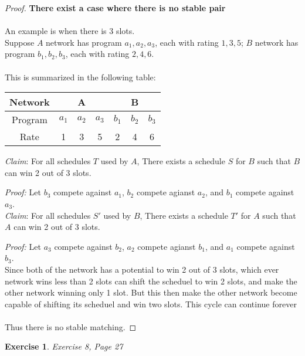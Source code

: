 \documentclass[11pt]{amsart}
\theoremstyle{theorem}
\newtheorem{exercise}{Exercise}
\begin{document}
\begin{proof}
\textbf{There exist a case where there is no stable pair} \\\\
An example is when there is 3 slots. \\
Suppose $ A $ network has program $ a_1, a_2, a_3 $, each with rating $ 1,3,5 $; $ B $ network has program $ b_1, b_2 ,b_3 $, each with rating $ 2,4,6 $.\\\\
This is summarized in the following table:\begin{table}
	\begin{tabular}{|c|c|l|l|c|l|l|}
		\hline
		\multicolumn{1}{|l|}{\textbf{Network}} & \multicolumn{3}{c|}{\textbf{A}}                                            & \multicolumn{3}{c|}{\textbf{B}}                                            \\ \hline
		Program                                & \multicolumn{1}{l|}{$a_1$} & $a_2$                    & $a_3$                    & \multicolumn{1}{l|}{$b_1$} & $b_2$                    & $b_3$                    \\ \hline
		Rate                                   & 1                        & \multicolumn{1}{c|}{3} & \multicolumn{1}{c|}{5} & 2                        & \multicolumn{1}{c|}{4} & \multicolumn{1}{c|}{6} \\ \hline
	\end{tabular}
\label{Table 1}
\end{table}
\textit{Claim}: For all schedules $ T $ used by $ A $, There exists a schedule $ S $ for $ B $ such that $ B $ can win 2 out of 3 slots.

\textit{Proof:} Let $ b_3 $ compete against $ a_1 $, $ b_2 $ compete agianst $ a_2 $, and $ b_1 $ compete against $ a_3 $.\\

\textit{Claim}: For all schedules $ S' $ used by $ B $, There exists a schedule $ T' $ for $ A $ such that $ A $ can win 2 out of 3 slots.

\textit{Proof:} Let $ a_3 $ compete against $ b_2 $, $ a_2 $ compete agianst $ b_1 $, and $ a_1 $ compete against $ b_3 $.\\

Since both of the network has a potential to win 2 out of 3 slots, which ever network wins less than 2 slots can shift the scheduel to win 2 slots, and make the other network winning only 1 slot. But this then make the other network become capable of shifting its scheduel and win two slots. This cycle can continue forever\\\\
Thus there is no stable matching.
\end{proof}
\hfill
\begin{exercise}
Exercise 8, Page 27
\end{exercise}
\end{document}
